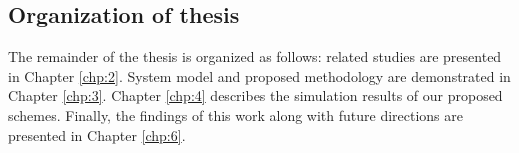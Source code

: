 \subsection{Organization of thesis}\hypertarget{organization of thesis}{}
The remainder of the thesis is organized as follows: related studies are presented in Chapter \ref{chp:2}. System model and proposed methodology are demonstrated in Chapter \ref{chp:3}. Chapter \ref{chp:4} describes the simulation results of our proposed schemes. Finally, the findings of this work along with future directions are presented in Chapter \ref{chp:6}.


\clearpage
